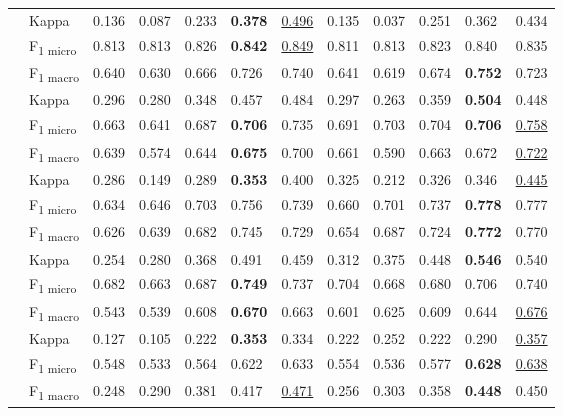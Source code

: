 \begin{table}
\begin{tabular}{ l l l l l l l l l l l l}
& Kappa & 0.136 & 0.087 & 0.233 & \textbf{0.378} & \underline{0.496} & 0.135 & 0.037 & 0.251 & 0.362 & 0.434 \\ \addlinespace[2ex]
\multirow{3}{*}{Mean} & F\textsubscript{1 micro} & 0.813 & 0.813 & 0.826 & \textbf{0.842} & \underline{0.849} & 0.811 & 0.813 & 0.823 & 0.840 & 0.835 \\
& F\textsubscript{1 macro} & 0.640 & 0.630 & 0.666 & 0.726 & 0.740 & 0.641 & 0.619 & 0.674 & \textbf{0.752} & 0.723 \\
& Kappa & 0.296 & 0.280 & 0.348 & 0.457 & 0.484 & 0.297 & 0.263 & 0.359 & \textbf{0.504} & 0.448 \\ \addlinespace[2ex]
\multirow{3}{*}{Controv.} & F\textsubscript{1 micro} & 0.663 & 0.641 & 0.687 & \textbf{0.706} & 0.735 & 0.691 & 0.703 & 0.704 & \textbf{0.706} & \underline{0.758} \\
& F\textsubscript{1 macro} & 0.639 & 0.574 & 0.644 & \textbf{0.675} & 0.700 & 0.661 & 0.590 & 0.663 & 0.672 & \underline{0.722} \\
& Kappa & 0.286 & 0.149 & 0.289 & \textbf{0.353} & 0.400 & 0.325 & 0.212 & 0.326 & 0.346 & \underline{0.445} \\ \addlinespace[2ex]
\multirow{3}{*}{Disagree.} & F\textsubscript{1 micro} & 0.634 & 0.646 & 0.703 & 0.756 & 0.739 & 0.660 & 0.701 & 0.737 & \textbf{0.778} & 0.777 \\
& F\textsubscript{1 macro} & 0.626 & 0.639 & 0.682 & 0.745 & 0.729 & 0.654 & 0.687 & 0.724 & \textbf{0.772} & 0.770 \\
& Kappa & 0.254 & 0.280 & 0.368 & 0.491 & 0.459 & 0.312 & 0.375 & 0.448 & \textbf{0.546} & 0.540 \\ \addlinespace[2ex]
\multirow{3}{*}{Off-topic} & F\textsubscript{1 micro} & 0.682 & 0.663 & 0.687 & \textbf{0.749} & 0.737 & 0.704 & 0.668 & 0.680 & 0.706 & 0.740 \\
& F\textsubscript{1 macro} & 0.543 & 0.539 & 0.608 & \textbf{0.670} & 0.663 & 0.601 & 0.625 & 0.609 & 0.644 & \underline{0.676} \\
& Kappa & 0.127 & 0.105 & 0.222 & \textbf{0.353} & 0.334 & 0.222 & 0.252 & 0.222 & 0.290 & \underline{0.357} \\ \addlinespace[2ex]
\multirow{3}{*}{Sentiment} & F\textsubscript{1 micro} & 0.548 & 0.533 & 0.564 & 0.622 & 0.633 & 0.554 & 0.536 & 0.577 & \textbf{0.628} & \underline{0.638} \\
& F\textsubscript{1 macro} & 0.248 & 0.290 & 0.381 & 0.417 & \underline{0.471} & 0.256 & 0.303 & 0.358 & \textbf{0.448} & 0.450 \\

\end{tabular}
\end{table}
